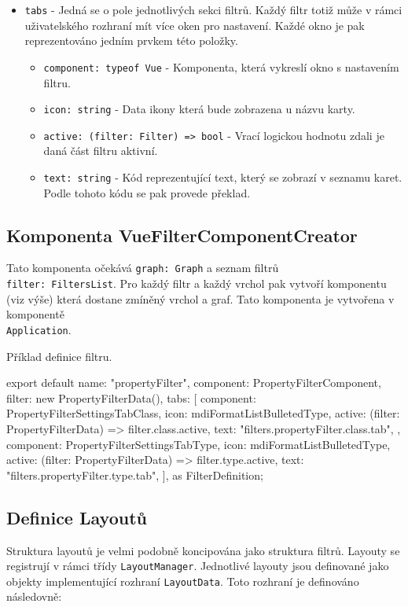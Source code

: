 \begin{itemize}
  \item \texttt{tabs} - Jedná se o pole jednotlivých sekci filtrů. Každý filtr totiž může v rámci uživatelského rozhraní mít více oken pro nastavení. Každé okno je pak reprezentováno jedním prvkem této položky.
  \begin{itemize}
    \item \texttt{component: typeof Vue} - Komponenta, která vykreslí okno s nastavením filtru.
    \item \texttt{icon: string} - Data ikony která bude zobrazena u názvu karty.
    \item \texttt{active: (filter: Filter) => bool} - Vrací logickou hodnotu zdali je daná část filtru aktivní.
    \item \texttt{text: string} - Kód reprezentující text, který se zobrazí v seznamu karet. Podle tohoto kódu se pak provede překlad.
  \end{itemize}

\end{itemize}

\subsection*{Komponenta VueFilterComponentCreator}
Tato komponenta očekává \texttt{graph: Graph} a seznam filtrů \\\texttt{filter: FiltersList}. Pro každý filtr a každý vrchol pak vytvoří komponentu (viz výše) která dostane zmíněný vrchol a graf. Tato komponenta je vytvořena v komponentě \\\texttt{Application}.

Příklad definice filtru.
\begin{code}
export default {
    name: "propertyFilter",
    component: PropertyFilterComponent,
    filter: new PropertyFilterData(),
    tabs: [{
        component: PropertyFilterSettingsTabClass,
        icon: mdiFormatListBulletedType,
        active: (filter: PropertyFilterData) => filter.class.active,
        text: "filters.propertyFilter.class.tab",
    }, {
        component: PropertyFilterSettingsTabType,
        icon: mdiFormatListBulletedType,
        active: (filter: PropertyFilterData) => filter.type.active,
        text: "filters.propertyFilter.type.tab",
    }],
} as FilterDefinition;
\end{code}


\subsection{Definice Layoutů}
Struktura layoutů je velmi podobně koncipována jako struktura filtrů. Layouty se registrují v rámci třídy \texttt{LayoutManager}. Jednotlivé layouty jsou definované jako objekty implementující rozhraní \texttt{LayoutData}. Toto rozhraní je definováno následovně:

